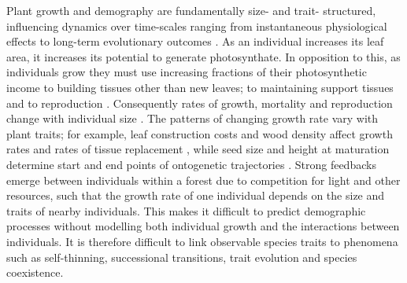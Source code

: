 \documentclass[a4paper,11pt]{article}
\begin{document}
Plant growth and demography are fundamentally size- and trait-
structured, influencing dynamics over time-scales ranging from
instantaneous physiological effects to long-term evolutionary outcomes
\citep{Harper-1977, Westoby-2002}. 
%
As an individual increases its leaf area, it increases its potential
to generate photosynthate.
%
In opposition to this, as individuals grow they must use increasing
fractions of their photosynthetic income to building tissues other
than new leaves; to maintaining support tissues \citep{Givnish-1988,
  Enquist-2007} and to reproduction \citep{Thomas-2011}.
%
Consequently rates of growth, mortality and reproduction change with
individual size \citep{Muller-2006, Ruger-2011, Thomas-2011}.  The
patterns of changing growth rate vary with plant traits; for example,
leaf construction costs and wood density affect growth rates and rates
of tissue replacement \citep{Wright-2010}, while seed size and height
at maturation determine start and end points of ontogenetic
trajectories \citep{Westoby-2002}.
%
Strong feedbacks emerge between individuals within a forest due to
competition for light and other resources, such that the growth rate
of one individual depends on the size and traits of nearby
individuals.
%
This makes it difficult to predict demographic processes without
modelling both individual growth and the interactions between
individuals.
%
It is therefore difficult to link observable species traits to
phenomena such as self-thinning, successional transitions, trait
evolution and species coexistence.
\end{document}

